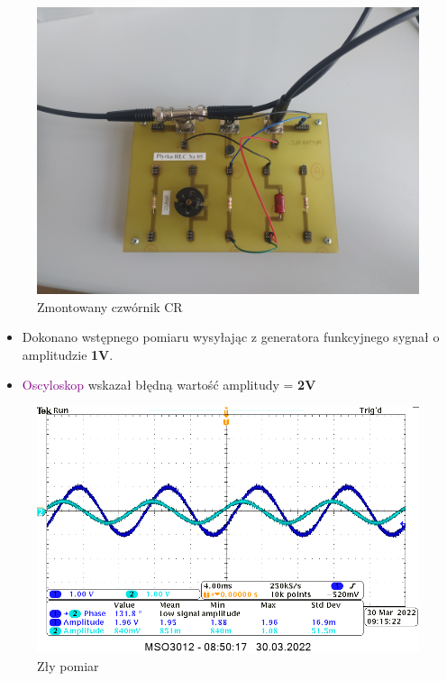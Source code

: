 \begin{itemize}
\begin{figure}[h]
        \includegraphics[scale=0.15]{img_phone/IMG_20220330_094222_smaller.jpg}
        \caption{Zmontowany czwórnik CR}
        \label{fig:builtCR}
    \end{figure}
\end{itemize}

\begin{itemize}    
    \item Dokonano wstępnego pomiaru wysyłając z generatora funkcyjnego sygnał o amplitudzie \textbf{1V}.
    \label{literowka:oscylator} \item \textcolor{purple}{Oscyloskop} wskazał błędną wartość amplitudy = \textbf{2V}
\end{itemize}

\begin{figure}[h]
    \centering
    \includegraphics[scale=0.4]{img_osciloscope/2_sinusy_zzla_amplituda_cropped.png}
    \caption{Zły pomiar}
    \label{fig:zly_pomiar}
    \end{figure}

